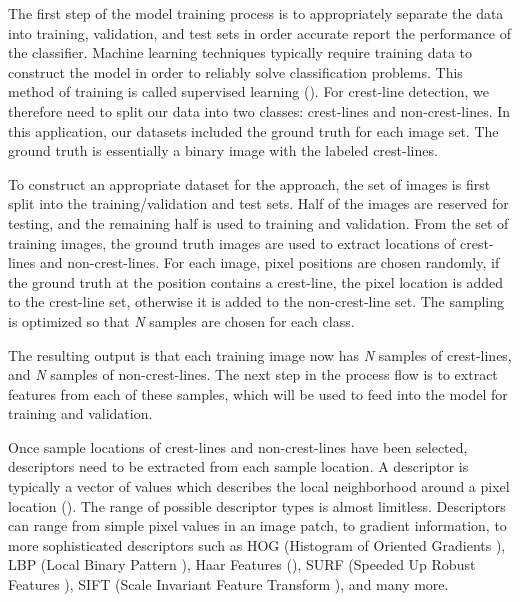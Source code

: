 The first step of the model training process is to appropriately separate the data into training, validation, and test sets in order accurate report the performance of the classifier. Machine learning techniques typically require training data to construct the model in order to reliably solve classification problems. This method of training is called supervised learning (\cite{foundations_machine_learning_book,machine_learning_book}). For crest-line detection, we therefore need to split our data into two classes: crest-lines and non-crest-lines. In this application, our datasets included the ground truth for each image set. The ground truth is essentially a binary image with the labeled crest-lines. 

To construct an appropriate dataset for the approach, the set of images is first split into the training/validation and test sets. Half of the images are reserved for testing, and the remaining half is used to training and validation. From the set of training images, the ground truth images are used to extract locations of crest-lines and non-crest-lines. For each image, pixel positions are chosen randomly, if the ground truth at the position contains a crest-line, the pixel location is added to the crest-line set, otherwise it is added to the non-crest-line set. The sampling is optimized so that \emph{N} samples are chosen for each class.

The resulting output is that each training image now has \emph{N} samples of crest-lines, and \emph{N} samples of non-crest-lines. The next step in the process flow is to extract features from each of these samples, which will be used to feed into the model for training and validation.

Once sample locations of crest-lines and non-crest-lines have been selected, descriptors need to be extracted from each sample location. A descriptor is typically a vector of values which describes the local neighborhood around a pixel location (\cite{lowe_sift_paper,1994_good_features_to_track,1998_feature_detection,2007_invariant_features_survey}). The range of possible descriptor types is almost limitless. Descriptors can range from simple pixel values in an image patch, to gradient information, to more sophisticated descriptors such as HOG (Histogram of Oriented Gradients \cite{2007_hog_human_detection}), LBP (Local Binary Pattern \cite{1994_lbp_paper,1996_lbp_paper}), Haar Features (\cite{2001_viola_jones_paper}), SURF (Speeded Up Robust Features \cite{2006_surf}), SIFT (Scale Invariant Feature Transform \cite{lowe_sift_paper}), and many more. 

